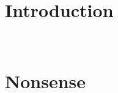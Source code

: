 \documentclass{article}
\begin{document}
\printnomenclature

\section{Introduction}

\lipsum[1]\\

\cite{muscutt2017four}

\section{Nonsense}

\lipsum[2-4]
\end{document}
